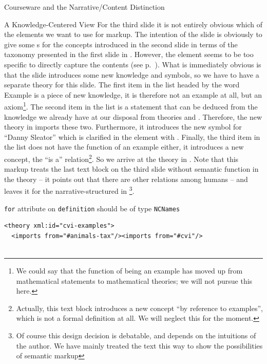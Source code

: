 \begin{tchapter}[id=courseware]{Courseware and the Narrative/Content Distinction}
\begin{tsection}[id=knowledge-centered]{A Knowledge-Centered View}
For the third slide it is not entirely obvious which of the {\omdoc} elements we want to
use for markup. The intention of the slide is obviously to give some {s}
for the concepts introduced in the second slide in terms of the taxonomy presented in the
first slide in {}. However, the {\omdoc} {} element
seems to be too specific to directly capture the contents (see
p.~\pageref{eldef:example}). What is immediately obvious is that the slide introduces some
new knowledge and symbols, so we have to have a separate theory for this slide. The first
item in the list headed by the word Example is a piece of new knowledge, it is therefore
not an example at all, but an axiom\footnote{We could say that the function of being an
  example has moved up from mathematical statements to mathematical theories; we will not
  pursue this here.}. The second item in the list is a statement that can be deduced from
the knowledge we already have at our disposal from theories {}
and {}.  Therefore, the new theory {} in
{} imports these two. Furthermore, it introduces the new symbol
{} for ``Danny Sleator'' which is clarified in the {}
element with {}. Finally, the third item in the list does not have
the function of an example either, it introduces a new concept, the ``is a''
relation{}\footnote{Actually, this
  text block introduces a new concept ``by reference to examples'', which is not a formal
  definition at all. We will neglect this for the moment.}.  So we arrive at the theory in
{}.  Note that this markup treats the last text block on the third
slide without semantic function in the theory -- it points out that there are other
relations among humans -- and leaves it for the narrative-structured {\omdoc} in
{}\footnote{Of course this design decision is debatable,
  and depends on the intuitions of the author.  We have mainly treated the text this way
  to show the possibilities of semantic markup}.

\begin{erratum}[reported-by=Michael Kohlhase,date=2009-08-11]{{\texttt{for}} attribute on
    {\texttt{definition}} should be of type {\texttt{NCNames}}}
\begin{lstlisting}[label=lst:ann-cvi-ex,
    caption={The {\omdoc} Representation for Slide 3 from {\myfigref{15-211}}},
    index={theory,imports,axiom,symbol,assertion,definition,CMP}]
<theory xml:id="cvi-examples">
  <imports from="#animals-tax"/><imports from="#cvi"/>


\end{lstlisting}
\end{erratum}
\end{tsection}
\end{tchapter}
